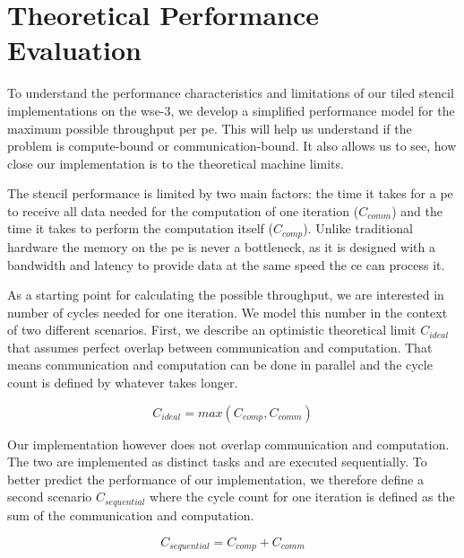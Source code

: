 \chapter{Theoretical Performance Evaluation}
\label{sec:theory_performance}
To understand the performance characteristics and limitations of our tiled stencil implementations on the \ac{wse}-3, we develop a simplified performance model for the maximum possible throughput per \ac{pe}. This will help us understand if the problem is compute-bound or communication-bound. It also allows us to see, how close our implementation is to the theoretical machine limits.

The stencil performance is limited by two main factors: the time it takes for a \ac{pe} to receive all data needed for the computation of one iteration ($C_{comm}$) and the time it takes to perform the computation itself ($C_{comp}$). Unlike traditional hardware the memory on the \ac{pe} is never a bottleneck, as it is designed with a bandwidth and latency to provide data at the same speed the \ac{ce} can process it.

As a starting point for calculating the possible throughput, we are interested in number of cycles needed for one iteration. We model this number in the context of two different scenarios. First, we describe an optimistic theoretical limit $C_{ideal}$ that assumes perfect overlap between communication and computation. That means communication and computation can be done in parallel and the cycle count is defined by whatever takes longer.

\begin{equation}
    \label{eq:c_ideal}
    C_{ideal} = max\left(C_{comp}, C_{comm}\right)
\end{equation}


Our implementation however does not overlap communication and computation. The two are implemented as distinct tasks and are executed sequentially. To better predict the performance of our implementation, we therefore define a second scenario $C_{sequential}$ where the cycle count for one iteration is defined as the sum of the communication and computation.

\begin{equation}
    \label{eq:c_sequential}
    C_{sequential} = C_{comp} + C_{comm}
\end{equation}

